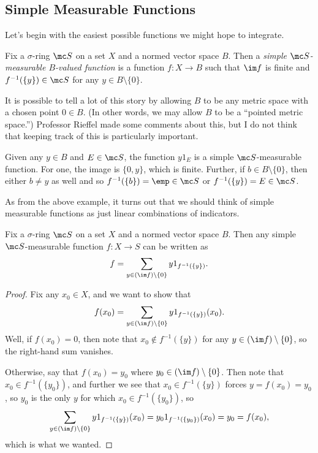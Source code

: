 \documentclass[../notes.tex]{subfiles}
\begin{document}
\subsection{Simple Measurable Functions}
Let's begin with the easiest possible functions we might hope to integrate.
\begin{definition}
	Fix a $\sigma$-ring $\mc S$ on a set $X$ and a normed vector space $B$. Then a \textit{simple $\mc S$-measurable $B$-valued function} is a function $f\colon X\to B$ such that $\im f$ is finite and $f^{-1}(\{y\})\in\mc S$ for any $y\in B\setminus\{0\}$.
\end{definition}
\begin{remark}
	It is possible to tell a lot of this story by allowing $B$ to be any metric space with a chosen point $0\in B$. (In other words, we may allow $B$ to be a ``pointed metric space.'') Professor Rieffel made some comments about this, but I do not think that keeping track of this is particularly important.
\end{remark}
\begin{example} \label{ex:indicator-is-simple}
	Given any $y\in B$ and $E\in\mc S$, the function $y1_E$ is a simple $\mc S$-measurable function. For one, the image is $\{0,y\}$, which is finite. Further, if $b\in B\setminus\{0\}$, then either $b\ne y$ as well and so $f^{-1}(\{b\})=\emp\in\mc S$ or $f^{-1}(\{y\})=E\in\mc S$.
\end{example}
As from the above example, it turns out that we should think of simple measurable functions as just linear combinations of indicators.
\begin{lemma} \label{lem:simple-is-linear-combo-of-chars}
	Fix a $\sigma$-ring $\mc S$ on a set $X$ and a normed vector space $B$. Then any simple $\mc S$-measurable function $f\colon X\to S$ can be written as
	\[f=\sum_{y\in(\im f)\setminus\{0\}}y1_{f^{-1}(\{y\})}.\]
\end{lemma}
\begin{proof}
	Fix any $x_0\in X$, and we want to show that
	\[f(x_0)=\sum_{y\in(\im f)\setminus\{0\}}y1_{f^{-1}(\{y\})}(x_0).\]
	Well, if $f(x_0)=0$, then note that $x_0\notin f^{-1}(\{y\})$ for any $y\in(\im f)\setminus\{0\}$, so the right-hand sum vanishes.
	
	Otherwise, say that $f(x_0)=y_0$ where $y_0\in(\im f)\setminus\{0\}$. Then note that $x_0\in f^{-1}(\{y_0\})$, and further we see that $x_0\in f^{-1}(\{y\})$ forces $y=f(x_0)=y_0$, so $y_0$ is the only $y$ for which $x_0\in f^{-1}(\{y_0\})$, so
	\[\sum_{y\in(\im f)\setminus\{0\}}y1_{f^{-1}(\{y\})}(x_0)=y_01_{f^{-1}(\{y_0\})}(x_0)=y_0=f(x_0),\]
	which is what we wanted.
\end{proof}
\end{document}
